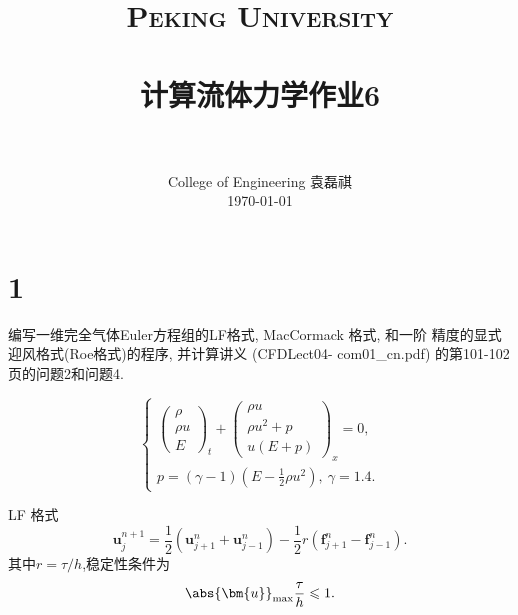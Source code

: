 \documentclass[12pt]{article}
\title{
		\vspace{-1in} 	
		\usefont{OT1}{bch}{b}{n}
		\normalfont \normalsize \textsc{\LARGE Peking University}\\[0.2cm] %
		\horrule{0.5pt} \\[0.2cm]
		\huge \bfseries{计算流体力学作业6} \\[-0.2cm]
		\horrule{2pt} \\[0.2cm]
}
\author{
		\normalfont 								\normalsize
		College of Engineering \quad 2001111690  \quad 袁磊祺\\	\normalsize
        \today
}
\date{}
\begin{document}


\maketitle

\section{1}

编写一维完全气体Euler方程组的LF格式, MacCormack 格式, 和一阶
精度的显式迎风格式(Roe格式)的程序, 并计算讲义 (CFDLect04-
com01_cn.pdf) 的第101-102页的问题2和问题4.

\begin{equation}
	\left\{\begin{array}{c}
	\left(\begin{array}{c}
	\rho \\
	\rho u \\
	E
	\end{array}\right)_{t}+\left(\begin{array}{c}
	\rho u \\
	\rho u^{2}+p \\
	u(E+p)
	\end{array}\right)_x=0, \\
	p=(\gamma-1)\left(E-\frac{1}{2} \rho u^{2}\right),\ \gamma=1.4.
	\end{array}\right.
\end{equation}

LF 格式
\begin{equation}
	\bm{u}^{n+1}_{j} = \frac{1}{2} \left( \bm{u}^{n}_{j+1} + \bm{u}^{n}_{j-1} \right) - \frac{1}{2} r \left( \bm{f}^{n}_{j+1} - \bm{f}^{n}_{j-1} \right).
\end{equation}
其中$r=\tau/h$,稳定性条件为
\begin{equation}
	\abs{\bm{u}}_{\max} \frac{\tau}{h} \leqslant 1.
\end{equation}











































\end{document}
